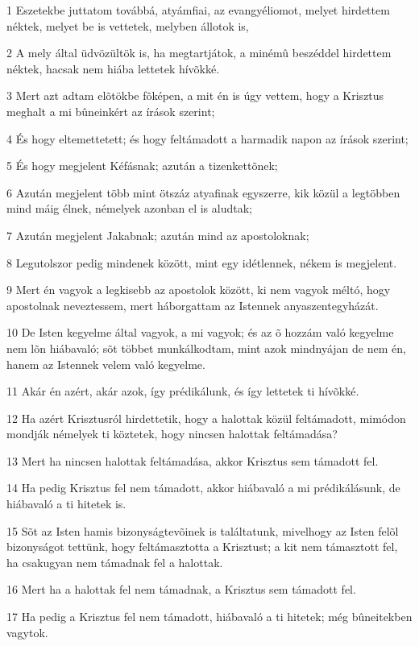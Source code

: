 \par 1 Eszetekbe juttatom továbbá, atyámfiai, az evangyéliomot, melyet hirdettem néktek, melyet be  is vettetek, melyben állotok is,
\par 2 A mely által üdvözültök is, ha megtartjátok, a minémû beszéddel hirdettem néktek, hacsak nem hiába lettetek hívõkké.
\par 3 Mert azt adtam elõtökbe fõképen, a mit én is úgy vettem, hogy a Krisztus meghalt a mi bûneinkért  az írások szerint;
\par 4 És hogy eltemettetett; és hogy feltámadott a harmadik napon az írások szerint;
\par 5 És hogy megjelent Kéfásnak; azután a  tizenkettõnek;
\par 6 Azután megjelent több mint ötszáz atyafinak egyszerre, kik közül a legtöbben mind máig élnek, némelyek azonban el is aludtak;
\par 7 Azután megjelent Jakabnak; azután mind az apostoloknak;
\par 8 Legutolszor pedig mindenek között, mint egy idétlennek, nékem is megjelent.
\par 9 Mert én vagyok a legkisebb az apostolok között, ki nem vagyok méltó, hogy apostolnak neveztessem, mert háborgattam az Istennek  anyaszentegyházát.
\par 10 De Isten kegyelme által vagyok, a mi vagyok; és az õ hozzám való kegyelme  nem lõn hiábavaló; sõt többet munkálkodtam, mint azok mindnyájan de nem én, hanem az Istennek velem való kegyelme.
\par 11 Akár én azért, akár azok, így prédikálunk, és így lettetek ti hívõkké.
\par 12 Ha azért Krisztusról hirdettetik, hogy a halottak közül feltámadott, mimódon mondják némelyek ti köztetek, hogy nincsen halottak feltámadása?
\par 13 Mert ha nincsen halottak feltámadása, akkor Krisztus sem támadott fel.
\par 14 Ha pedig Krisztus fel nem támadott, akkor hiábavaló a mi prédikálásunk, de hiábavaló a ti hitetek is.
\par 15 Sõt az Isten hamis bizonyságtevõinek is találtatunk, mivelhogy az Isten felõl bizonyságot tettünk, hogy feltámasztotta a Krisztust; a kit nem támasztott fel, ha csakugyan nem támadnak fel a halottak.
\par 16 Mert ha a halottak fel nem támadnak, a Krisztus sem támadott fel.
\par 17 Ha pedig a Krisztus fel nem támadott, hiábavaló a ti hitetek; még bûneitekben vagytok.
